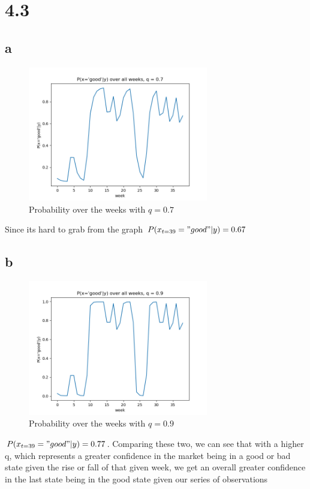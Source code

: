 \documentclass[12pt]{article}
\begin{document}
\section{4.3}
\subsection{a}
\begin{figure}[H]
	\includegraphics[width=0.7\textwidth]{q_0_7.png}
	\caption{Probability over the weeks with $q=0.7$}
\end{figure}
Since its hard to grab from the graph $P(x_{t=39}="good"|y) = 0.67$
\subsection{b}
\begin{figure}[H]
	\includegraphics[width=0.7\textwidth]{q_0_9.png}
	\caption{Probability over the weeks with $q=0.9$}
\end{figure}
$P(x_{t=39}="good"|y) = 0.77$. Comparing these two, we can see that with a higher q, which represents a greater confidence in the market being in a good or bad state given the rise or fall of that given week, we get an overall greater confidence in the last state being in the good state given our series of observations
\end{document}
